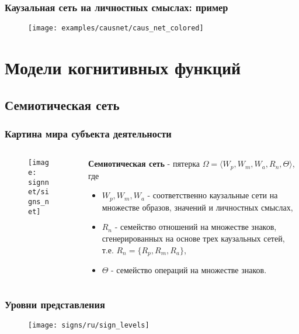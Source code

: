\documentclass[default]{beamer}
\begin{document}
	\begin{frame}
		\frametitle{Каузальная сеть на личностных смыслах: пример}
		
		\begin{figure}
			\texttt{[image: examples/causnet/caus\_net\_colored]}
		\end{figure}
		
	\end{frame}	

	\section{Модели когнитивных функций}
	\subsection{Семиотическая сеть}
	\begin{frame}
		\frametitle{Картина мира субъекта деятельности}
		
		\begin{columns}
			\begin{column}{0.55\textwidth}
				\begin{figure}
					\texttt{[image: signnet/signs\_net]}
				\end{figure}
			\end{column}
			\begin{column}{0.45\textwidth}
				\textbf{Семиотическая сеть} - пятерка $\Omega=\langle W_p, W_m, W_a, R_n, \Theta \rangle$, где
				\begin{itemize}
					\item $W_p, W_m, W_a$ - соответственно каузальные сети на множестве образов, значений и личностных смыслах,
					\item $R_n$ - семейство отношений на множестве знаков, сгенерированных на основе трех каузальных сетей, т.е. $R_n=\{R_p, R_m, R_a\}$,
					\item $\Theta$ - семейство операций на множестве знаков.
				\end{itemize}
			\end{column}
		\end{columns}
		\nocite{*}
		\printbibliography[keyword={symbsign}, resetnumbers=true]
	\end{frame}	

	\begin{frame}
		\frametitle{Уровни представления}
		
		\begin{figure}
			\texttt{[image: signs/ru/sign\_levels]}
		\end{figure}
	\end{frame}	
	
\end{document}
